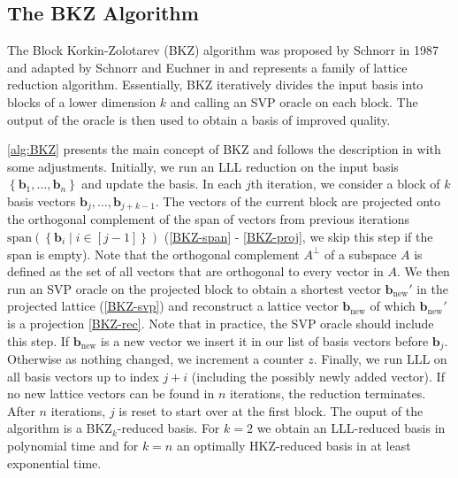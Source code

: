 \subsection{The BKZ Algorithm} \label{sec:BKZ}

The Block Korkin-Zolotarev (BKZ) algorithm was proposed by Schnorr in 1987 and adapted by Schnorr and Euchner in \cite{SE91} and represents a family of lattice reduction algorithm. Essentially, BKZ iteratively divides the input basis into blocks of a lower dimension $k$ and calling an SVP oracle on each block. The output of the oracle is then used to obtain a basis of improved quality.

\cref{alg:BKZ} presents the main concept of BKZ and follows the description in \cite{CN11} with some adjustments. Initially, we run an LLL reduction on the input basis $\left\{\mathbf{b}_1, \dots, \mathbf{b}_{n}\right\}$ and update the basis. In each $j$th iteration, we consider a block of $k$ basis vectors $\mathbf{b}_j, \dots, \mathbf{b}_{j+k-1}$. The vectors of the current block are projected onto the orthogonal complement of the span of vectors from previous iterations $\text{span}\left(\left\{\mathbf{b}_i \mid i \in [j-1]\right\}\right)$ (\cref{BKZ-span} - \ref{BKZ-proj}, we skip this step if the span is empty). Note that the orthogonal complement $A^\perp$  of a subspace $A$ is defined as the set of all vectors that are orthogonal to every vector in $A$. We then run an SVP oracle on the projected block to obtain a shortest vector $\mathbf{b}_\text{new}'$ in the projected lattice (\cref{BKZ-svp}) and reconstruct a lattice vector $\mathbf{b}_\text{new}$ of which $\mathbf{b}_\text{new}'$ is a projection \cref{BKZ-rec}. Note that in practice, the SVP oracle should include this step. If $\mathbf{b}_\text{new}$ is a new vector we insert it in our list of basis vectors before $\mathbf{b}_j$. Otherwise as nothing changed, we increment a counter $z$. Finally, we run LLL on all basis vectors up to index $j+i$ (including the possibly newly added vector). If no new lattice vectors can be found in $n$ iterations, the reduction terminates. After $n$ iterations, $j$ is reset to start over at the first block. The ouput of the algorithm is a BKZ$_k$-reduced basis. For $k=2$ we obtain an LLL-reduced basis in polynomial time and for $k=n$ an optimally HKZ-reduced basis in at least exponential time.%


